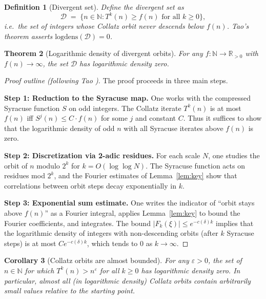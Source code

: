 \documentclass[12pt,a4paper]{article}
\newtheorem{theorem}{Theorem}[section]
\newtheorem{corollary}[theorem]{Corollary}
\newtheorem{definition}[theorem]{Definition}
\begin{document}
\begin{definition}[Divergent set]\label{def:divergent}
Define the \emph{divergent set} as
\[
  \mathcal{D} \;=\; \bigl\{ n \in \mathbb{N} : T^k(n) \geq f(n) \text{ for all } k \geq 0 \bigr\},
\]
i.e.\ the set of integers whose Collatz orbit never descends below $f(n)$.
Tao's theorem asserts $\mathrm{logdens}(\mathcal{D}) = 0$.
\end{definition}

\begin{theorem}[Logarithmic density of divergent orbits]\label{thm:logdens_zero}
For any $f\colon \mathbb{N} \to \mathbb{R}_{>0}$ with $f(n) \to \infty$, the set
$\mathcal{D}$ has logarithmic density zero.
\end{theorem}

\begin{proof}[Proof outline (following Tao \cite{Tao2022})]
The proof proceeds in three main steps.

\textbf{Step 1: Reduction to the Syracuse map.}
One works with the compressed Syracuse function $S$ on odd integers. The Collatz iterate
$T^k(n)$ is at most $f(n)$ iff $S^j(n) \leq C \cdot f(n)$ for some $j$ and constant $C$.
Thus it suffices to show that the logarithmic density of odd $n$ with all Syracuse iterates
above $f(n)$ is zero.

\textbf{Step 2: Discretization via 2-adic residues.}
For each scale $N$, one studies the orbit of $n$ modulo $2^k$ for $k = O(\log \log N)$.
The Syracuse function acts on residues mod $2^k$, and the Fourier estimates of
Lemma~\ref{lem:key} show that correlations between orbit steps decay exponentially in $k$.

\textbf{Step 3: Exponential sum estimate.}
One writes the indicator of ``orbit stays above $f(n)$'' as a Fourier integral, applies
Lemma~\ref{lem:key} to bound the Fourier coefficients, and integrates. The bound
$|F_k(\xi)| \leq e^{-c(\delta)k}$ implies that the logarithmic density of integers with
non-descending orbits (after $k$ Syracuse steps) is at most $C e^{-c(\delta)k}$, which
tends to 0 as $k \to \infty$.
\end{proof}

\begin{corollary}[Collatz orbits are almost bounded]\label{cor:almost_bounded}
For any $\varepsilon > 0$, the set of $n \in \mathbb{N}$ for which $T^k(n) > n^\varepsilon$
for all $k \geq 0$ has logarithmic density zero. In particular, almost all (in logarithmic density)
Collatz orbits contain arbitrarily small values relative to the starting point.
\end{corollary}
\end{document}
